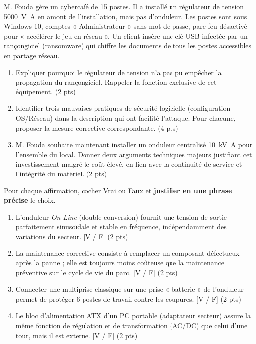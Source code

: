 \documentclass[11pt]{article}
\begin{document}
\begin{exercice}
M. Fouda gère un cybercafé de 15 postes. Il a installé un régulateur de tension \SI{5000}{\volt\ampere} en amont de l'installation, mais pas d'onduleur. Les postes sont sous Windows 10, comptes « Administrateur » sans mot de passe, pare-feu désactivé pour « accélérer le jeu en réseau ». Un client insère une clé USB infectée par un rançongiciel (ransomware) qui chiffre les documents de tous les postes accessibles en partage réseau.
\begin{enumerate}
    \item Expliquer pourquoi le régulateur de tension n'a pas pu empêcher la propagation du rançongiciel. Rappeler la fonction exclusive de cet équipement. (2 pts)
    \item Identifier trois mauvaises pratiques de sécurité logicielle (configuration OS/Réseau) dans la description qui ont facilité l'attaque. Pour chacune, proposer la mesure corrective correspondante. (4 pts)
    \item M. Fouda souhaite maintenant installer un onduleur centralisé \SI{10}{\kilo\volt\ampere} pour l'ensemble du local. Donner deux arguments techniques majeurs justifiant cet investissement malgré le coût élevé, en lien avec la continuité de service et l'intégrité du matériel. (2 pts)
\end{enumerate}
\end{exercice}

\begin{exercice}
Pour chaque affirmation, cocher Vrai ou Faux et \textbf{justifier en une phrase précise} le choix.
\begin{enumerate}
    \item L'onduleur \textit{On-Line} (double conversion) fournit une tension de sortie parfaitement sinusoïdale et stable en fréquence, indépendamment des variations du secteur. \hfill [V / F] (2 pts)
    \item La maintenance corrective consiste à remplacer un composant défectueux après la panne ; elle est toujours moins coûteuse que la maintenance préventive sur le cycle de vie du parc. \hfill [V / F] (2 pts)
    \item Connecter une multiprise classique sur une prise « batterie » de l'onduleur permet de protéger 6 postes de travail contre les coupures. \hfill [V / F] (2 pts)
    \item Le bloc d'alimentation ATX d'un PC portable (adaptateur secteur) assure la même fonction de régulation et de transformation (AC/DC) que celui d'une tour, mais il est externe. \hfill [V / F] (2 pts)
\end{enumerate}
\end{exercice}
\end{document}
